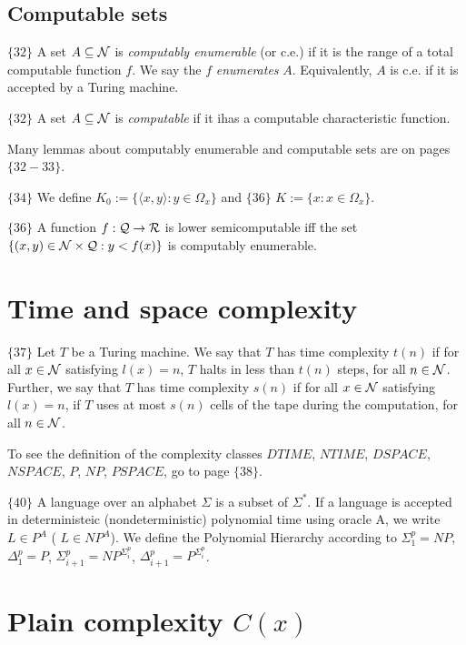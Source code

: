 \documentclass{article}
\begin{document}
\subsection{Computable sets}


$\{32 \}$ A set $A \subseteq \mathcal{N}$ is \textit{computably enumerable} (or c.e.) if it is the range of a total computable function $f$. We say the $f$ \textit{enumerates} $A$. Equivalently, $A$ is c.e. if it is accepted by a Turing machine. 

$\{32 \}$ A set $A \subseteq \mathcal{N}$ is \textit{computable} if it ihas a computable characteristic function. 

Many lemmas about computably enumerable and computable sets are on pages $\{32-33 \}$.

$\{ 34 \}$ We define $K_0 := \{ \langle x,y \rangle : y \in \Omega_x \}$ and $\{36\}$ $K := \{ x : x \in \Omega_x\}$.

$\{36\}$ A function $f : \mathcal{Q} \to \mathcal{R}$ is lower semicomputable iff the set $\{(x,y) \in \mathcal{N} \times \mathcal{Q}: y < f(x)\}$ is computably enumerable.

\section{Time and space complexity}

$\{ 37 \}$ Let $T$ be a Turing machine. We say that $T$ has time complexity $t(n)$ if for all $x \in \mathcal{N}$ satisfying $l(x) = n$, $T$ halts in less than $t(n)$ steps, for all $n \in \mathcal{N}$. Further, we say that $T$ has time complexity $s(n)$ if for all $x \in \mathcal{N}$ satisfying $l(x) = n$, if $T$ uses at most $s(n)$ cells of the tape during the computation, for all $n \in \mathcal{N}$.

To see the definition of the complexity classes $DTIME$, $NTIME$, $DSPACE$, $NSPACE$, $P$, $NP$, $PSPACE$, go to page $\{38\}$.

$\{40\}$ A language over an alphabet $\Sigma$ is a subset of $\Sigma^\ast$. If a language is accepted in deterministeic (nondeterministic) polynomial time using oracle A, we write $L \in P^A$ ( $L \in NP^A$). We define the Polynomial Hierarchy according to $\Sigma_1^p = NP$, $\Delta_1^p = P$, $\Sigma_{i+1}^p = NP^{\Sigma_i^p}$, $\Delta_{i+1}^p = P^{\Sigma_i^p}$. 




\section{Plain complexity $C(x)$}
\end{document}

